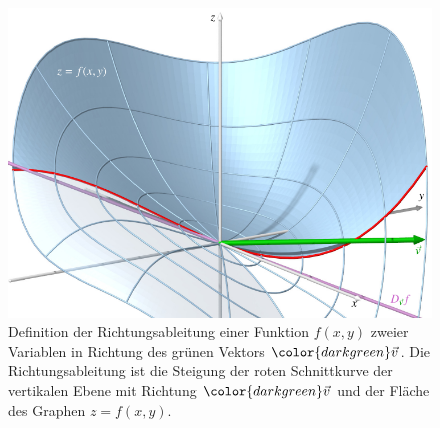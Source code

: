 %
%
%
\begin{figure}
\centering
\includegraphics{chapters/010-fuvar/images/richtungsabl.pdf}
\caption{Definition der Richtungsableitung einer Funktion $f(x,y)$
zweier Variablen in Richtung des {\color{darkgreen}grünen}
Vektors ${\color{darkgreen}\vec{v}}$.
Die Richtungsableitung ist die Steigung der {\color{darkred}roten}
Schnittkurve der vertikalen Ebene mit Richtung ${\color{darkgreen}\vec{v}}$ 
und der Fläche des Graphen $z=f(x,y)$.
\label{buch:fuvar:richtungsableitung:fig:richtungsableitung}}
\end{figure}
